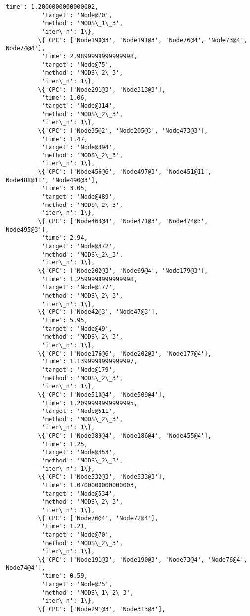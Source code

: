 \documentclass[11pt]{article}
\begin{document}
\begin{Verbatim}[commandchars=\\\{\}]
           'time': 1.2000000000000002,
           'target': 'Node@70',
           'method': 'MODS\_1\_3',
           'iter\_n': 1\},
          \{'CPC': ['Node190@3', 'Node191@3', 'Node76@4', 'Node73@4', 'Node74@4'],
           'time': 2.9899999999999998,
           'target': 'Node@75',
           'method': 'MODS\_2\_3',
           'iter\_n': 1\},
          \{'CPC': ['Node291@3', 'Node313@3'],
           'time': 1.06,
           'target': 'Node@314',
           'method': 'MODS\_2\_3',
           'iter\_n': 1\},
          \{'CPC': ['Node35@2', 'Node205@3', 'Node473@3'],
           'time': 1.47,
           'target': 'Node@394',
           'method': 'MODS\_2\_3',
           'iter\_n': 1\},
          \{'CPC': ['Node456@6', 'Node497@3', 'Node451@11', 'Node488@11', 'Node490@3'],
           'time': 3.05,
           'target': 'Node@489',
           'method': 'MODS\_2\_3',
           'iter\_n': 1\},
          \{'CPC': ['Node463@4', 'Node471@3', 'Node474@3', 'Node495@3'],
           'time': 2.94,
           'target': 'Node@472',
           'method': 'MODS\_2\_3',
           'iter\_n': 1\},
          \{'CPC': ['Node202@3', 'Node69@4', 'Node179@3'],
           'time': 1.2599999999999998,
           'target': 'Node@177',
           'method': 'MODS\_2\_3',
           'iter\_n': 1\},
          \{'CPC': ['Node42@3', 'Node47@3'],
           'time': 5.95,
           'target': 'Node@49',
           'method': 'MODS\_2\_3',
           'iter\_n': 1\},
          \{'CPC': ['Node176@6', 'Node202@3', 'Node177@4'],
           'time': 1.1399999999999997,
           'target': 'Node@179',
           'method': 'MODS\_2\_3',
           'iter\_n': 1\},
          \{'CPC': ['Node510@4', 'Node509@4'],
           'time': 1.2099999999999995,
           'target': 'Node@511',
           'method': 'MODS\_2\_3',
           'iter\_n': 1\},
          \{'CPC': ['Node389@4', 'Node186@4', 'Node455@4'],
           'time': 1.25,
           'target': 'Node@453',
           'method': 'MODS\_2\_3',
           'iter\_n': 1\},
          \{'CPC': ['Node532@3', 'Node533@3'],
           'time': 1.0700000000000003,
           'target': 'Node@534',
           'method': 'MODS\_2\_3',
           'iter\_n': 1\},
          \{'CPC': ['Node76@4', 'Node72@4'],
           'time': 1.21,
           'target': 'Node@70',
           'method': 'MODS\_2\_3',
           'iter\_n': 1\},
          \{'CPC': ['Node191@3', 'Node190@3', 'Node73@4', 'Node76@4', 'Node74@4'],
           'time': 0.59,
           'target': 'Node@75',
           'method': 'MODS\_1\_2\_3',
           'iter\_n': 1\},
          \{'CPC': ['Node291@3', 'Node313@3'],

\end{Verbatim}
\end{document}
